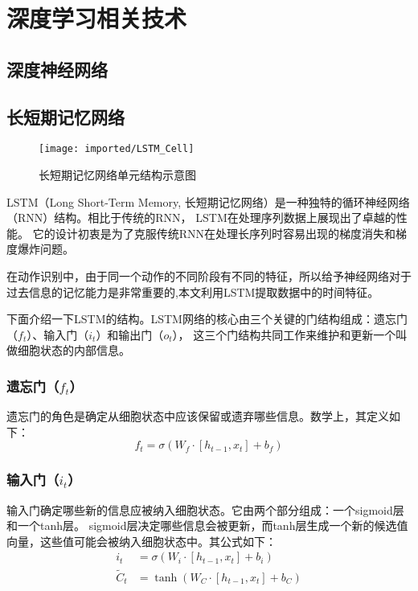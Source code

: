 \section{深度学习相关技术}
\subsection{深度神经网络}


\subsection{长短期记忆网络}
\begin{figure}[htbp]
    \centering
    \texttt{[image: imported/LSTM\_Cell]}
    \caption{\label{fig:LSTM_Cell}长短期记忆网络单元结构示意图}
\end{figure}

LSTM（Long Short-Term Memory, 长短期记忆网络）是一种独特的循环神经网络（RNN）结构。相比于传统的RNN，
LSTM在处理序列数据上展现出了卓越的性能。
它的设计初衷是为了克服传统RNN在处理长序列时容易出现的梯度消失和梯度爆炸问题。

在动作识别中，由于同一个动作的不同阶段有不同的特征，所以给予神经网络对于过去信息的记忆能力是非常重要的,本文利用LSTM提取数据中的时间特征。

下面介绍一下LSTM的结构。LSTM网络的核心由三个关键的门结构组成：遗忘门（\(f_t\)）、输入门（\(i_t\)）和输出门（\(o_t\)），
这三个门结构共同工作来维护和更新一个叫做细胞状态的内部信息。

\subsubsection{遗忘门（\(f_t\)）}
遗忘门的角色是确定从细胞状态中应该保留或遗弃哪些信息。数学上，其定义如下：
\begin{equation}
f_t = \sigma(W_f \cdot [h_{t-1}, x_t] + b_f)
\end{equation}

\subsubsection{输入门（\(i_t\)）}
输入门确定哪些新的信息应被纳入细胞状态。它由两个部分组成：一个sigmoid层和一个tanh层。
sigmoid层决定哪些信息会被更新，而tanh层生成一个新的候选值向量，这些值可能会被纳入细胞状态中。其公式如下：
\begin{align}
i_t &= \sigma(W_i \cdot [h_{t-1}, x_t] + b_i) \\
\tilde{C}_t &= \tanh(W_C \cdot [h_{t-1}, x_t] + b_C)
\end{align}

